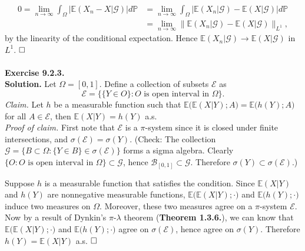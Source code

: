 \documentclass[12pt]{extarticle}
\begin{document}
\begin{equation*}
\begin{aligned}
0=\lim_{n\rightarrow\infty}\int_\Omega\big|\mathbb{E}\left(X_n-X | \mathcal{G}\right)\big|d\mathbb{P}&=\lim_{n\rightarrow\infty}\int_\Omega\big|\mathbb{E}\left(X_n | \mathcal{G}\right)-\mathbb{E}\left(X | \mathcal{G}\right)\big|d\mathbb{P}\\&
=\lim_{n\rightarrow\infty}\big\|\mathbb{E}(X_n | \mathcal{G})-\mathbb{E}(X | \mathcal{G})\big\|_{L^1},
\end{aligned}
\end{equation*}
by the linearity of the conditional expectation. Hence $\mathbb{E}(X_n | \mathcal{G})\rightarrow\mathbb{E}(X | \mathcal{G})$ in $L^1$.
$\hspace{\fill}\square$
\\ \\
\textbf{Exercise 9.2.3.} \\
\textbf{Solution.} Let $\Omega=[0,1]$. Define a collection of subsets $\mathcal{E}$ as
\begin{equation*}
\mathcal{E}=\big\{\{Y\in O\}:O\text{ is open interval in }\Omega\big\}.
\end{equation*}
\textit{Claim.} Let $h$ be a measurable function such that $\mathbb{E}\big(\mathbb{E}(X|Y);A\big)=\mathbb{E}\big(h(Y);A\big)$ for all $A\in\mathcal{E}$, then $\mathbb{E}(X|Y)=h(Y)$ a.s.\\
\textit{Proof of claim.} First note that $\mathcal{E}$ is a $\pi$-system since it is closed under finite intersections, and $\sigma(\mathcal{E})=\sigma(Y)$. (Check: The collection $\mathcal{G}=\big\{B\subset\Omega:\{Y\in B\}\in\sigma(\mathcal{E})\big\}$ forms a sigma algebra. Clearly $\{O:O\text{ is open interval in }\Omega\}\subset\mathcal{G}$, hence $\mathcal{B}_{[0,1]}\subset \mathcal{G}$. Therefore $\sigma(Y)\subset\sigma(\mathcal{E})$.)

Suppose $h$ is a measurable function that satisfies the condition. Since $\mathbb{E}(X|Y)$ and $h(Y)$ are nonnegative measurable functions, $\mathbb{E}\big(\mathbb{E}(X|Y);\cdot\big)$ and $\mathbb{E}\big(h(Y);\cdot\big)$ induce two measures on $\Omega$. Moreover, these two measures agree on a $\pi$-system $\mathcal{E}$. Now by a result of Dynkin's $\pi$-$\lambda$ theorem (\textbf{Theorem 1.3.6.}), we can know that $\mathbb{E}\big(\mathbb{E}(X|Y);\cdot\big)$ and $\mathbb{E}\big(h(Y);\cdot\big)$ agree on $\sigma(\mathcal{E})$, hence agree on $\sigma(Y)$. Therefore $h(Y)=\mathbb{E}(X|Y)$ a.s.
$\hspace{\fill}\square$
\end{document}
